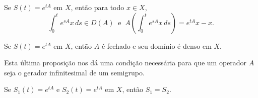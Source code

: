 \begin{frame}{ }
\begin{prop}
Se $S(t)=e^{tA}$ em $X$, então para todo $x\in X$, 
\[\int_0^t e^{sA}x\,ds\in D(A)\ \text{ e }\ A\left(\int_0^t e^{sA}x\,ds\right)=e^{tA}x-x.\]
\end{prop}

\begin{prop}
Se $S(t)=e^{tA}$ em $X$, então $A$ é fechado e seu domínio é denso em $X$.
\end{prop}

\begin{exampleblock}{}
Esta última proposição nos dá uma condição necessária para que um operador $A$ seja o gerador infinitesimal de um semigrupo.
\end{exampleblock}
\begin{prop}[Unicidade]
Se $S_1(t)=e^{tA}$ e $S_2(t)=e^{tA}$ em $X$, então $S_1=S_2$.
\end{prop}
\end{frame}


